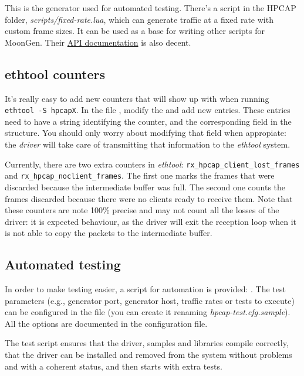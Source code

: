 \documentclass[oneside]{hpman}
\begin{document}
This is the generator used for automated testing. There's a script in the HPCAP folder, \textit{scripts/fixed-rate.lua}, which can generate traffic at a fixed rate with custom frame sizes. It can be used as a base for writing other scripts for MoonGen. Their \href{http://scholzd.github.io/MoonGen/index.html}{API documentation} is also decent.

\subsection{ethtool counters}

It's really easy to add new counters that will show up with  when running \texttt{ethtool -S hpcapX}. In the file , modify the  and add new entries. These entries need to have a string identifying the counter, and the corresponding field in the  structure. You should only worry about modifying that field when appropiate: the \textit{driver} will take care of transmitting that information to the \textit{ethtool} system.

Currently, there are two extra counters in \textit{ethtool}: \texttt{rx\_hpcap\_client\_lost\_frames} and \texttt{rx\_hpcap\_noclient\_frames}. The first one marks the frames that were discarded because the intermediate buffer was full. The second one counts the frames discarded because there were no clients ready to receive them. Note that these counters are note 100\% precise and may not count all the losses of the driver: it is expected behaviour, as the driver will exit the reception loop when it is not able to copy the packets to the intermediate buffer.

\subsection{Automated testing}
\label{sec:debugtest:AutomatedTesting}

In order to make testing easier, a script for automation is provided: . The test parameters (e.g., generator port, generator host, traffic rates or tests to execute) can be configured in the file  (you can create it renaming \textit{hpcap-test.cfg.sample}). All the options are documented in the configuration file.

The test script ensures that the driver, samples and libraries compile correctly, that the driver can be installed and removed from the system without problems and with a coherent status, and then starts with extra tests.
\end{document}
